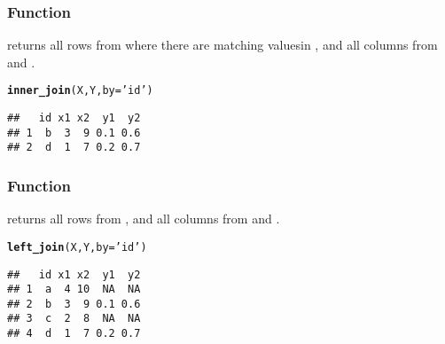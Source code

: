 \documentclass[12pt]{beamer}\usepackage[]{graphicx}\usepackage[]{color}
\makeatletter
\newcommand{\hlstr}[1]{\textcolor[rgb]{0.192,0.494,0.8}{#1}}%
\newcommand{\hlstd}[1]{\textcolor[rgb]{0.345,0.345,0.345}{#1}}%
\newcommand{\hlkwc}[1]{\textcolor[rgb]{0.333,0.667,0.333}{#1}}%
\newcommand{\hlkwd}[1]{\textcolor[rgb]{0.737,0.353,0.396}{\textbf{#1}}}%
\newenvironment{kframe}{%
 \def\at@end@of@kframe{}%
 \ifinner\ifhmode%
  \def\at@end@of@kframe{\end{minipage}}%
  \begin{minipage}{\columnwidth}%
 \fi\fi%
 \def\FrameCommand##1{\hskip\@totalleftmargin \hskip-\fboxsep
 \colorbox{shadecolor}{##1}\hskip-\fboxsep
     \hskip-\linewidth \hskip-\@totalleftmargin \hskip\columnwidth}%
 \MakeFramed {\advance\hsize-\width
   \@totalleftmargin\z@ \linewidth\hsize
   \@setminipage}}%
 {\par\unskip\endMakeFramed%
 \at@end@of@kframe}
\newenvironment{knitrout}{}{} %
\makeatother
\begin{document}

\begin{frame}[fragile]
\frametitle{Function }

 returns all rows from  where there are matching valuesin , and all columns from  and .
\begin{knitrout}\footnotesize
{}\color{fgcolor}\begin{kframe}
\begin{alltt}
\hlkwd{inner_join}\hlstd{(X, Y,} \hlkwc{by} \hlstd{=} \hlstr{'id'}\hlstd{)}
\end{alltt}
\begin{verbatim}
##   id x1 x2  y1  y2
## 1  b  3  9 0.1 0.6
## 2  d  1  7 0.2 0.7
\end{verbatim}
\end{kframe}
\end{knitrout}

\end{frame}


\begin{frame}[fragile]
\frametitle{Function }

 returns all rows from , and all columns from  and .
\begin{knitrout}\footnotesize
{}\color{fgcolor}\begin{kframe}
\begin{alltt}
\hlkwd{left_join}\hlstd{(X, Y,} \hlkwc{by} \hlstd{=} \hlstr{'id'}\hlstd{)}
\end{alltt}
\begin{verbatim}
##   id x1 x2  y1  y2
## 1  a  4 10  NA  NA
## 2  b  3  9 0.1 0.6
## 3  c  2  8  NA  NA
## 4  d  1  7 0.2 0.7
\end{verbatim}
\end{kframe}
\end{knitrout}

\end{frame}

\end{document}
